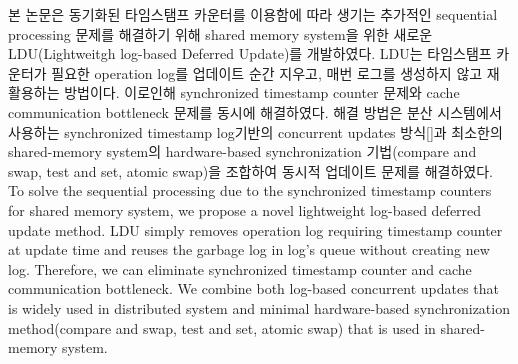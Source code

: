 %
\ifkor
본 논문은 동기화된 타임스탬프 카운터를 이용함에 따라 생기는 추가적인 sequential processing 문제를
해결하기 위해 shared memory system을 위한 새로운 LDU(Lightweitgh log-based Deferred Update)를
개발하였다.
LDU는 타임스탬프 카운터가 필요한 operation log를 업데이트 순간 지우고, 매번 로그를 생성하지 않고 재활용하는 방법이다.
이로인해 synchronized timestamp counter 문제와 cache communication bottleneck 문제를 동시에
해결하였다.
해결 방법은 분산 시스템에서 사용하는 synchronized timestamp log기반의 concurrent updates 방식[]과
최소한의 shared-memory system의 hardware-based synchronization 기법(compare and swap,
test and set, atomic swap)을 조합하여 동시적 업데이트 문제를 해결하였다.
\else
To solve the sequential processing due to the synchronized timestamp counters
for shared memory system, we propose a novel lightweight log-based deferred
update method.
LDU simply removes operation log requiring timestamp counter at update time and
reuses the garbage log in log's queue without creating new log.
Therefore, we can eliminate synchronized timestamp counter and cache
communication bottleneck.
We combine both log-based concurrent updates that is widely used in
distributed system and minimal hardware-based synchronization method(compare and
swap, test and set, atomic swap) that is used in shared-memory system.
\fi

